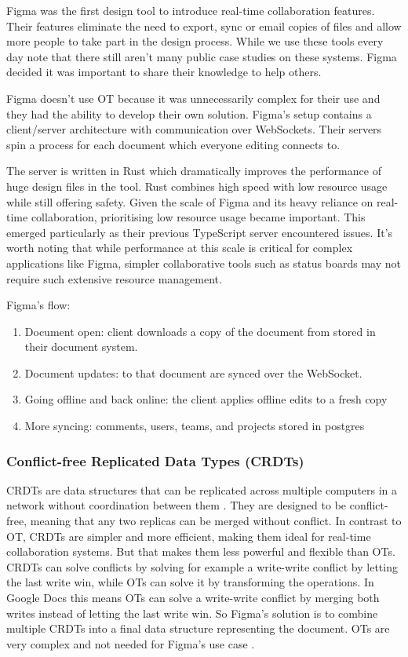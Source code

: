 Figma was the first design tool to introduce real-time collaboration features. Their features eliminate the need to export, sync or email copies of files and allow more people to take part in the design process. While we use these tools every day note that there still aren't many public case studies on these systems. Figma decided it was important to share their knowledge to help others.

Figma doesn't use OT because it was unnecessarily complex for their use and they had the ability to develop their own solution. Figma's setup contains a client/server architecture with communication over WebSockets. Their servers spin a process for each document which everyone editing connects to. \cite{figma-rtc}

The server is written in Rust which dramatically improves the performance of huge design files in the tool. Rust combines high speed with low resource usage while still offering safety. Given the scale of Figma and its heavy reliance on real-time collaboration, prioritising low resource usage became important. This emerged particularly as their previous TypeScript server encountered issues. It's worth noting that while performance at this scale is critical for complex applications like Figma, simpler collaborative tools such as status boards may not require such extensive resource management. \cite{figma-rust}

Figma's flow:

\begin{enumerate}
  \item Document open: client downloads a copy of the document from stored in their document system.
  \item Document updates: to that document are synced over the WebSocket.
  \item Going offline and back online: the client applies offline edits to a fresh copy
  \item More syncing: comments, users, teams, and projects stored in postgres
\end{enumerate}

\subsubsection*{Conflict-free Replicated Data Types (CRDTs)}

CRDTs are data structures that can be replicated across multiple computers in a network without coordination between them \cite{crdt}. They are designed to be conflict-free, meaning that any two replicas can be merged without conflict. In contrast to OT, CRDTs are simpler and more efficient, making them ideal for real-time collaboration systems. But that makes them less powerful and flexible than OTs. CRDTs can solve conflicts by solving for example a write-write conflict by letting the last write win, while OTs can solve it by transforming the operations. In Google Docs this means OTs can solve a write-write conflict by merging both writes instead of letting the last write win. So Figma's solution is to combine multiple CRDTs into a final data structure representing the document. OTs are very complex and not needed for Figma's use case \cite{figma-rtc}.

